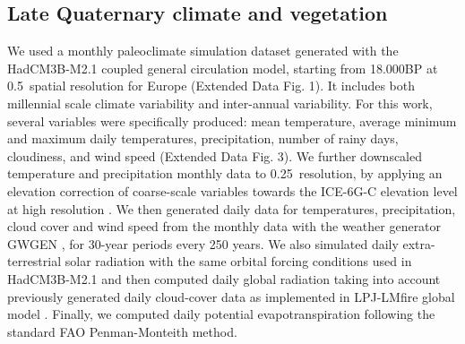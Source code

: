 \documentclass[pdflatex, sn-nature]{sn-jnl}%
\begin{document}
\subsection{Late Quaternary climate and vegetation}\label{paleodata}

We used a monthly paleoclimate simulation dataset \cite{Armstrong2019} generated with the HadCM3B-M2.1 coupled general circulation model, starting from 18.000BP at 0.5\degree~spatial resolution for Europe (Extended Data Fig. 1). It includes both millennial scale climate variability and inter-annual variability. For this work, several variables were specifically produced: mean temperature, average minimum and maximum daily temperatures, precipitation, number of rainy days, cloudiness, and wind speed (Extended Data Fig. 3). We further downscaled temperature and precipitation monthly data to 0.25\degree~resolution, by applying an elevation correction of coarse-scale variables towards the ICE-6G-C elevation level at high resolution \cite{Peltier2015}.  
We then generated daily data for temperatures, precipitation, cloud cover and wind speed from  the monthly data with the weather generator GWGEN \cite{Sommer2017}, for 30-year periods every 250 years. We also simulated daily extra-terrestrial solar radiation with the same orbital forcing conditions used in HadCM3B-M2.1 \cite{Armstrong2019} and then computed daily global radiation taking into account previously generated daily cloud-cover data as implemented in LPJ-LMfire global model \cite{Pfeiffer2013}. Finally, we computed daily potential evapotranspiration following the standard FAO Penman-Monteith method.  
\end{document}
